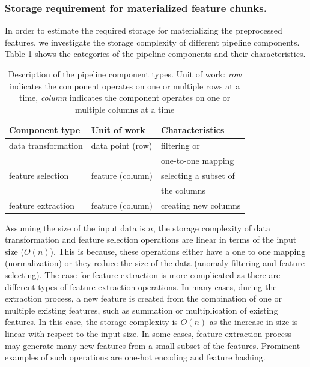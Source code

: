 \subsubsection{Storage requirement for materialized feature chunks.} 
In order to estimate the required storage for materializing the preprocessed features, we investigate the storage complexity of different pipeline components.
Table \ref{pipeline-component-description} shows the categories of the pipeline components and their characteristics.
\begin{table}[h!]
\centering
\begin{tabular}{lll}
\hline
\textbf{Component type}  & \textbf{Unit of work} &\textbf{Characteristics}  \\
\hline
data transformation			& data point (row)       	  & filtering or        \\
			&  	  &  one-to-one mapping        \\
feature selection            & feature (column)             & selecting a subset of   \\
			&  	  &   the columns        \\
feature extraction & feature (column) & creating new columns \\
\hline
\end{tabular}
\caption{Description of the pipeline component types. Unit of work: \textit{row} indicates the component operates on one or multiple rows at a time, \textit{column} indicates the component operates on one or multiple columns at a time}  
\label{pipeline-component-description}
\end{table}
Assuming the size of the input data is $n$, the storage complexity of data transformation and feature selection operations are linear in terms of the input size ($O(n)$).
This is because, these operations either have a one to one mapping (normalization) or they reduce the size of the data (anomaly filtering and feature selecting).
The case for feature extraction is more complicated as there are different types of feature extraction operations.
In many cases, during the extraction process, a new feature is created from the combination of one or multiple existing features, such as summation or multiplication of existing features. 
In this case, the storage complexity is $O(n)$ as the increase in size is linear with respect to the input size.
In some cases, feature extraction process may generate many new features from a small subset of the features.
Prominent examples of such operations are one-hot encoding and feature hashing.
